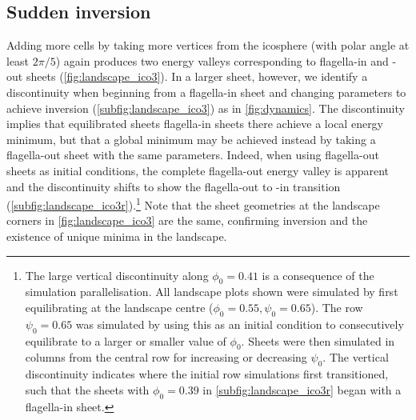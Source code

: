 \subsection{Sudden inversion}

Adding more cells by taking more vertices from the icosphere (with polar angle at least $2\pi/5$) again produces two energy valleys corresponding to flagella-in and -out sheets (\cref{fig:landscape_ico3}). 
In a larger sheet, however, we identify a discontinuity when beginning from a flagella-in sheet and changing parameters to achieve inversion (\cref{subfig:landscape_ico3}) as in \cref{fig:dynamics}.
The discontinuity implies that equilibrated sheets flagella-in sheets there achieve a local energy minimum, but that a global minimum may be achieved instead by taking a flagella-out sheet with the same parameters. 
Indeed, when using flagella-out sheets as initial conditions, the complete flagella-out energy valley is apparent and the discontinuity shifts to show the flagella-out to -in transition (\cref{subfig:landscape_ico3r}).\footnote{The large vertical discontinuity along $\phi_0=0.41$ is a consequence of the simulation parallelisation. All landscape plots shown were simulated by first equilibrating at the landscape centre ($\phi_0=0.55,\psi_0=0.65$). The row $\psi_0=0.65$ was simulated by using this as an initial condition to consecutively equilibrate to a larger or smaller value of $\phi_0$. Sheets were then simulated in columns from the central row for increasing or decreasing $\psi_0$. The vertical discontinuity indicates where the initial row simulations first transitioned, such that the sheets with $\phi_0=0.39$ in \cref{subfig:landscape_ico3r} began with a flagella-in sheet.}
Note that the sheet geometries at the landscape corners in \cref{fig:landscape_ico3} are the same, confirming inversion and the existence of unique minima in the landscape.

